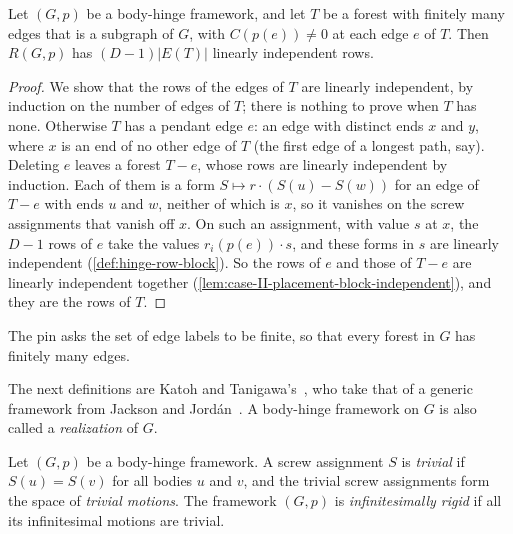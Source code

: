 \begin{lemma}
  \label{lem:forest-rows-independent}
  \leanok
  Let $(G,p)$ be a body-hinge framework, and let $T$ be a forest with
  finitely many edges that is a subgraph of $G$, with $C(p(e)) \neq 0$
  at each edge $e$ of $T$. Then $R(G,p)$ has $(D-1)|E(T)|$ linearly
  independent rows.
\end{lemma}
\begin{proof}
  \leanok
  We show that the rows of the edges of $T$ are linearly independent,
  by induction on the number of edges of $T$; there is nothing to prove
  when $T$ has none. Otherwise $T$ has a pendant edge $e$: an edge with
  distinct ends $x$ and $y$, where $x$ is an end of no other edge of $T$
  (the first edge of a longest path, say). Deleting $e$ leaves a forest
  $T - e$, whose rows are linearly independent by induction. Each of
  them is a form $S \mapsto r \cdot (S(u) - S(w))$ for an edge of
  $T - e$ with ends $u$ and $w$, neither of which is $x$, so it vanishes
  on the screw assignments that vanish off $x$. On such an assignment,
  with value $s$ at $x$, the $D - 1$ rows of $e$ take the values
  $r_i(p(e)) \cdot s$, and these forms in $s$ are linearly independent
  (\cref{def:hinge-row-block}). So the rows of $e$ and those of $T - e$
  are linearly independent together
  (\cref{lem:case-II-placement-block-independent}), and they are the
  rows of $T$.
\end{proof}

\begin{fmlnote}
  The pin asks the set of edge labels to be finite, so that every
  forest in $G$ has finitely many edges.
\end{fmlnote}

The next definitions are Katoh and
Tanigawa's~\cite[\S\S2.3--2.4]{katohTanigawa2011}, who take that of a
generic framework from Jackson and
Jord\'an~\cite[\S6]{jacksonJordan2009}. A body-hinge framework on $G$
is also called a \emph{realization} of $G$.

\begin{definition}
  \label{def:trivial-motions-rigid}
  \leanok
  Let $(G,p)$ be a body-hinge framework. A screw assignment $S$ is
  \emph{trivial} if $S(u) = S(v)$ for all bodies $u$ and $v$, and the
  trivial screw assignments form the space of \emph{trivial motions}.
  The framework $(G,p)$ is \emph{infinitesimally rigid} if all its
  infinitesimal motions are trivial.
\end{definition}

